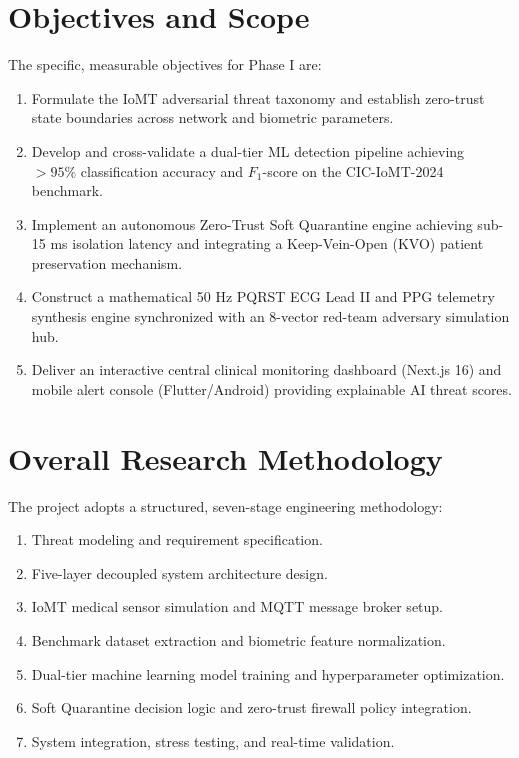 \documentclass[12pt,a4paper]{report}
\begin{document}
\section{Objectives and Scope}
The specific, measurable objectives for Phase I are:
\begin{enumerate}
    \item[\textbf{O1.}] Formulate the IoMT adversarial threat taxonomy and establish zero-trust state boundaries across network and biometric parameters.
    \item[\textbf{O2.}] Develop and cross-validate a dual-tier ML detection pipeline achieving $>95\%$ classification accuracy and $F_1$-score on the CIC-IoMT-2024 benchmark.
    \item[\textbf{O3.}] Implement an autonomous Zero-Trust Soft Quarantine engine achieving sub-15 ms isolation latency and integrating a Keep-Vein-Open (KVO) patient preservation mechanism.
    \item[\textbf{O4.}] Construct a mathematical 50 Hz PQRST ECG Lead II and PPG telemetry synthesis engine synchronized with an 8-vector red-team adversary simulation hub.
    \item[\textbf{O5.}] Deliver an interactive central clinical monitoring dashboard (Next.js 16) and mobile alert console (Flutter/Android) providing explainable AI threat scores.
\end{enumerate}

\section{Overall Research Methodology}
The project adopts a structured, seven-stage engineering methodology:
\begin{enumerate}
    \item Threat modeling and requirement specification.
    \item Five-layer decoupled system architecture design.
    \item IoMT medical sensor simulation and MQTT message broker setup.
    \item Benchmark dataset extraction and biometric feature normalization.
    \item Dual-tier machine learning model training and hyperparameter optimization.
    \item Soft Quarantine decision logic and zero-trust firewall policy integration.
    \item System integration, stress testing, and real-time validation.
\end{enumerate}
\end{document}
